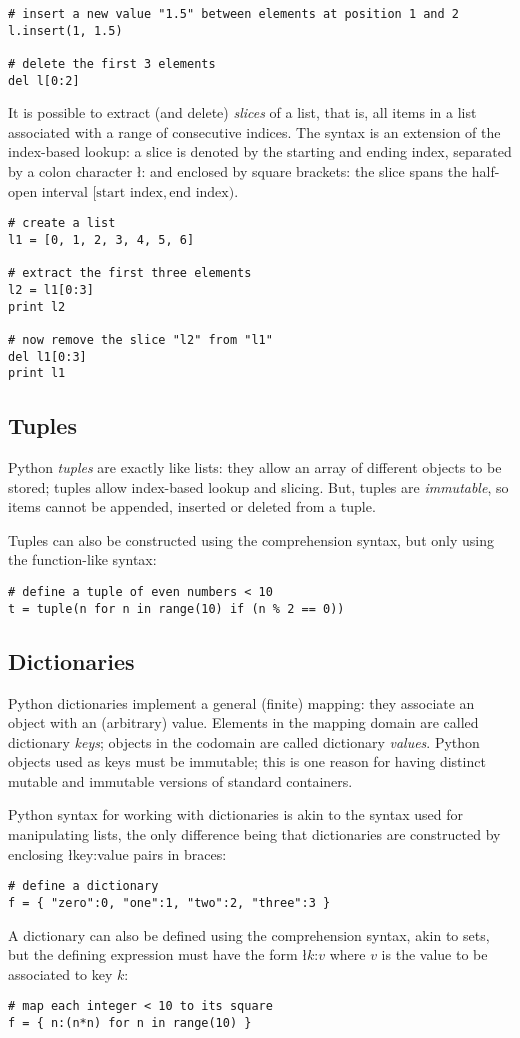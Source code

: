 {\begin{lstlisting}
# insert a new value "1.5" between elements at position 1 and 2
l.insert(1, 1.5)

# delete the first 3 elements
del l[0:2]
\end{lstlisting}
It is possible to extract (and delete) \emph{slices} of a list, that is,
all items in a list associated with a range of consecutive indices.
The syntax is an extension of the index-based lookup: a slice is
denoted by the starting and ending index, separated by a colon
character \l{:} and enclosed by square brackets: the slice spans the
half-open interval $[\text{start index}, \text{end index})$.
\begin{lstlisting}
# create a list
l1 = [0, 1, 2, 3, 4, 5, 6]

# extract the first three elements
l2 = l1[0:3]
print l2

# now remove the slice "l2" from "l1"
del l1[0:3]
print l1
\end{lstlisting}


\subsection{Tuples}
\label{sec:tuples}

Python \emph{tuples} are exactly like lists: they allow an array of
different objects to be stored; tuples allow index-based lookup and
slicing. But, tuples are \emph{immutable}, so items cannot be
appended, inserted or deleted from a tuple.

Tuples can also be constructed using the comprehension syntax, but
only using the function-like syntax:
\begin{lstlisting}
# define a tuple of even numbers < 10
t = tuple(n for n in range(10) if (n % 2 == 0))
\end{lstlisting}


\subsection{Dictionaries}
\label{sec:dicts}

Python dictionaries implement a general (finite) mapping: they
associate an object with an (arbitrary) value.  Elements in the
mapping domain are called dictionary \emph{keys}; objects in the
codomain are called dictionary \emph{values}.  Python objects used as
keys must be immutable; this is one reason for having distinct mutable
and immutable versions of standard containers.

Python syntax for working with dictionaries is akin to the syntax used
for manipulating lists, the only difference being that dictionaries
are constructed by enclosing \l{key:value} pairs in braces:
\begin{lstlisting}
# define a dictionary
f = { "zero":0, "one":1, "two":2, "three":3 }
\end{lstlisting}
A dictionary can also be defined using the comprehension syntax,
akin to sets, but the defining expression must have the form
\l{$k$:$v$} where $v$ is the value to be associated to key $k$:
\begin{lstlisting}
# map each integer < 10 to its square
f = { n:(n*n) for n in range(10) }


\end{lstlisting}}
